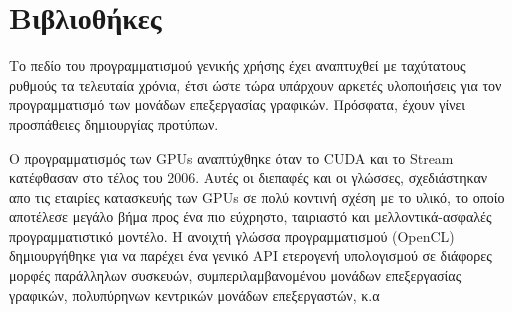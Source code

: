 \section{Βιβλιοθήκες}
Το πεδίο του προγραμματισμού γενικής χρήσης έχει αναπτυχθεί με ταχύτατους ρυθμούς τα τελευταία χρόνια, έτσι ώστε τώρα υπάρχουν αρκετές υλοποιήσεις για τον προγραμματισμό των μονάδων επεξεργασίας γραφικών. Πρόσφατα, έχουν γίνει προσπάθειες δημιουργίας προτύπων.

Ο προγραμματισμός των GPUs αναπτύχθηκε όταν το CUDA και το Stream κατέφθασαν στο τέλος του 2006. Αυτές οι διεπαφές και οι γλώσσες, σχεδιάστηκαν απο τις εταιρίες κατασκευής των GPUs σε πολύ κοντινή σχέση με το υλικό, το οποίο αποτέλεσε μεγάλο βήμα προς ένα πιο εύχρηστο, ταιριαστό και μελλοντικά-ασφαλές προγραμματιστικό μοντέλο. Η ανοιχτή γλώσσα προγραμματισμού (OpenCL) δημιουργήθηκε για να παρέχει ένα γενικό API ετερογενή υπολογισμού σε διάφορες μορφές παράλληλων συσκευών, συμπεριλαμβανομένου μονάδων επεξεργασίας γραφικών, πολυπύρηνων κεντρικών μονάδων επεξεργαστών, κ.α
